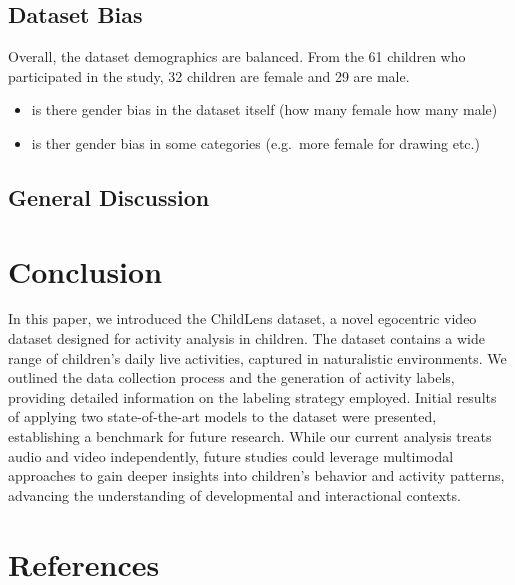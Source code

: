 \documentclass[
  man,floatsintext]{apa6}
\providecommand{\tightlist}{%
  \setlength{\itemsep}{0pt}\setlength{\parskip}{0pt}}
\begin{document}
\subsection{Dataset Bias}\label{dataset-bias}

Overall, the dataset demographics are balanced. From the 61 children who participated in the study, 32 children are female and 29 are male.

\begin{itemize}
\tightlist
\item
  is there gender bias in the dataset itself (how many female how many male)
\item
  is ther gender bias in some categories (e.g.~more female for drawing etc.)
\end{itemize}

\subsection{General Discussion}\label{general-discussion}

\section{Conclusion}\label{conclusion}

In this paper, we introduced the ChildLens dataset, a novel egocentric video dataset designed for activity analysis in children. The dataset contains a wide range of children's daily live activities, captured in naturalistic environments. We outlined the data collection process and the generation of activity labels, providing detailed information on the labeling strategy employed. Initial results of applying two state-of-the-art models to the dataset were presented, establishing a benchmark for future research. While our current analysis treats audio and video independently, future studies could leverage multimodal approaches to gain deeper insights into children's behavior and activity patterns, advancing the understanding of developmental and interactional contexts.

\newpage

\section{References}\label{references}

\begingroup
\setlength{\parindent}{-0.5in}
\setlength{\leftskip}{0.5in}
\end{document}
